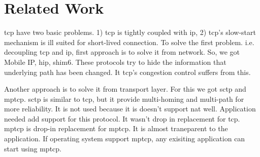 \section{Related Work}
\acrshort{tcp} have two basic problems. 1) \acrshort{tcp} is tightly coupled with \acrshort{ip}, 2) \acrshort{tcp}'s slow-start mechanism is ill suited for short-lived connection. 
To solve the first problem. i.e. decoupling \acrshort{tcp} and \acrshort{ip}, first approach is to solve it from network. So, we got Mobile IP, \acrfull{hip}, \acrfull{shim6}. These protocols try to hide the information that underlying path has been changed. It \acrshort{tcp}'s congestion control suffers from this.

Another approach is to solve it from transport layer. For this we got \acrfull{sctp} and \acrfull{mptcp}. \acrshort{sctp} is similar to \acrshort{tcp}, but it provide multi-homing and multi-path for more reliability. It is not used because it is doesn't support \acrfull{nat} well. Application needed add support for this protocol. It wasn't drop in replacement for \acrshort{tcp}. \acrshort{mptcp} is drop-in replacement for \acrshort{mptcp}. It is almost traneparent to the application. If operating system support \acrshort{mptcp}, any exisiting application can start using \acrshort{mptcp}.

